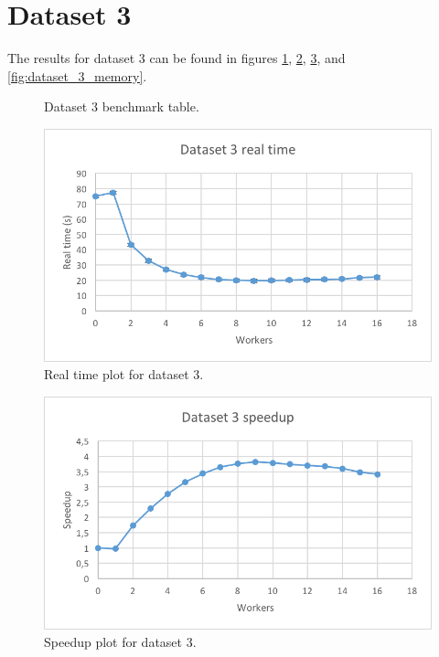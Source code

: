 \section{Dataset 3}
The results for dataset 3 can be found in figures \ref{fig:dataset_3_table}, \ref{fig:dataset_3_real_time}, \ref{fig:dataset_3_speedup}, and \ref{fig:dataset_3_memory}.

\begin{figure}[ht]
\centering
{}
\caption[Dataset 3 benchmark table.]{Dataset 3 benchmark table.}
\label{fig:dataset_3_table}
\end{figure}

\begin{figure}[ht]
  \centering
  \includegraphics[width=120mm]{figures/dataset_3/dataset_3_real_time.png}
  \caption[Real time plot for dataset 3.]{Real time plot for dataset 3.}
  \label{fig:dataset_3_real_time}
\end{figure}

\begin{figure}[ht]
  \centering
  \includegraphics[width=120mm]{figures/dataset_3/dataset_3_speedup.png}
  \caption[Speedup plot for dataset 3.]{Speedup plot for dataset 3.}
  \label{fig:dataset_3_speedup}
\end{figure}

